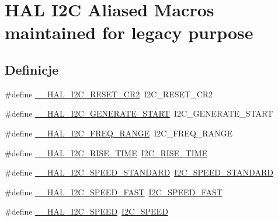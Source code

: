 \hypertarget{group___h_a_l___i2_c___aliased___macros}{}\section{H\+AL I2C Aliased Macros maintained for legacy purpose}
\label{group___h_a_l___i2_c___aliased___macros}
\subsection*{Definicje}
\begin{DoxyCompactItemize}
\item 
\#define \hyperlink{group___h_a_l___i2_c___aliased___macros_gaea93e7962941cd318a48facfa56af471}{\+\_\+\+\_\+\+H\+A\+L\+\_\+\+I2\+C\+\_\+\+R\+E\+S\+E\+T\+\_\+\+C\+R2}~I2\+C\+\_\+\+R\+E\+S\+E\+T\+\_\+\+C\+R2
\item 
\#define \hyperlink{group___h_a_l___i2_c___aliased___macros_ga0ed346d51a7d33f880be39a99d46ecb3}{\+\_\+\+\_\+\+H\+A\+L\+\_\+\+I2\+C\+\_\+\+G\+E\+N\+E\+R\+A\+T\+E\+\_\+\+S\+T\+A\+RT}~I2\+C\+\_\+\+G\+E\+N\+E\+R\+A\+T\+E\+\_\+\+S\+T\+A\+RT
\item 
\#define \hyperlink{group___h_a_l___i2_c___aliased___macros_ga4d75b1600113c9dc6b6478d523cf6fa1}{\+\_\+\+\_\+\+H\+A\+L\+\_\+\+I2\+C\+\_\+\+F\+R\+E\+Q\+\_\+\+R\+A\+N\+GE}~I2\+C\+\_\+\+F\+R\+E\+Q\+\_\+\+R\+A\+N\+GE
\item 
\#define \hyperlink{group___h_a_l___i2_c___aliased___macros_gabb738ef98a989848bd56e047e2e26c39}{\+\_\+\+\_\+\+H\+A\+L\+\_\+\+I2\+C\+\_\+\+R\+I\+S\+E\+\_\+\+T\+I\+ME}~\hyperlink{group___i2_c___private___macros_ga27cae7b1432cd160ab708e1548ba3165}{I2\+C\+\_\+\+R\+I\+S\+E\+\_\+\+T\+I\+ME}
\item 
\#define \hyperlink{group___h_a_l___i2_c___aliased___macros_ga194453c773974cabe77a235ee676da1b}{\+\_\+\+\_\+\+H\+A\+L\+\_\+\+I2\+C\+\_\+\+S\+P\+E\+E\+D\+\_\+\+S\+T\+A\+N\+D\+A\+RD}~\hyperlink{group___i2_c___private___macros_gaa71590c93b126e79fc86afbc819742b3}{I2\+C\+\_\+\+S\+P\+E\+E\+D\+\_\+\+S\+T\+A\+N\+D\+A\+RD}
\item 
\#define \hyperlink{group___h_a_l___i2_c___aliased___macros_gaa98b823b6fa54cae5a441cb21fa99b38}{\+\_\+\+\_\+\+H\+A\+L\+\_\+\+I2\+C\+\_\+\+S\+P\+E\+E\+D\+\_\+\+F\+A\+ST}~\hyperlink{group___i2_c___private___macros_ga9e5a85344d70ab05020e41ba24566f57}{I2\+C\+\_\+\+S\+P\+E\+E\+D\+\_\+\+F\+A\+ST}
\item 
\#define \hyperlink{group___h_a_l___i2_c___aliased___macros_gac17a40be49ac267bfe753d3006f85596}{\+\_\+\+\_\+\+H\+A\+L\+\_\+\+I2\+C\+\_\+\+S\+P\+E\+ED}~\hyperlink{group___i2_c___private___macros_ga0e871b470a0f7a9d641156f07e37c810}{I2\+C\+\_\+\+S\+P\+E\+ED}

\end{DoxyCompactItemize}
